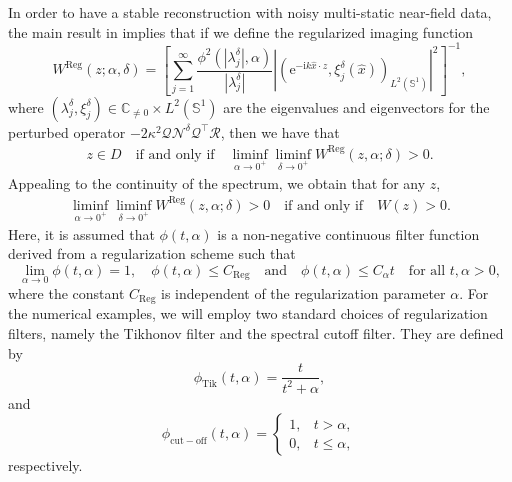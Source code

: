 \documentclass{article}
\begin{document}
In order to have a stable reconstruction with noisy multi-static near-field data, the main result in \cite{harris2023rfm} implies that if we define the regularized imaging function
\begin{equation}
\label{reg_W}
W^{\mathrm{Reg}}(z;\alpha,\delta)
=
\left[
\sum_{j=1}^{\infty}
\frac{\phi^2(|\lambda_j^\delta|,\alpha)}
{|\lambda_j^\delta|}
\left|
\left(
\mathrm e^{-\mathrm ik\hat{x}\cdot z},
\xi_j^\delta(\hat{x})
\right)_{L^2(\mathbb{S}^1)}
\right|^2
\right]^{-1},
\end{equation}
 where $(\lambda_j^\delta, \xi_j^\delta)\in \mathbb C_{\neq 0}\times L^2(\mathbb S^1)$ are the eigenvalues and eigenvectors for the perturbed operator $-2 \kappa^2 \mathcal Q\mathcal N^\delta\mathcal Q^\top \mathcal R$, then we have that
\begin{align}\label{range_test_W_reg}
z\in D\quad \text{if and only if}\quad \liminf_{\alpha\to 0^{+}}\liminf_{\delta\to 0^{+}}W^{\mathrm{Reg}}(z,\alpha;\delta)>0.
\end{align}
Appealing to the continuity of the spectrum, we obtain that for any $z$,
\begin{align}
    \liminf_{\alpha\to 0^{+}}\liminf_{\delta\to 0^{+}}W^{\mathrm{Reg}}(z,\alpha;\delta)>0\quad \text{if and only if}\quad W(z)>0.
\end{align}
Here, it is assumed that $\phi(t,\alpha)$ is a non-negative continuous filter function derived from a regularization scheme such that
\begin{equation}\label{filter_fnc}
    \lim_{\alpha\to 0}\phi(t,\alpha)=1,\quad \phi(t,\alpha)\leq C_{\mathrm{Reg}}\quad \text{and}\quad \phi(t,\alpha)\leq C_{\alpha}t\quad \text{for all }t,\alpha>0,
\end{equation}
where the constant $C_{\mathrm{Reg}}$ is independent of the regularization parameter $\alpha$. For the numerical examples, we will employ two standard choices of
regularization filters, namely the Tikhonov filter and the spectral cutoff filter. They are defined by
\begin{equation}\label{tikn}
\phi_{\mathrm{Tik}}(t,\alpha)
=
\frac{t}{t^2+\alpha},
\end{equation}
and
\begin{equation}\label{cutoff}
\phi_{\mathrm{cut-off}}(t,\alpha)
=
\begin{cases}
1, & t>\alpha,\\
0, & t\leq \alpha,
\end{cases}
\end{equation}
respectively.
\end{document}
